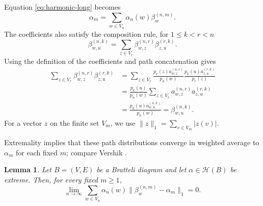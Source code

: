 \documentclass[11pt]{amsart}
\newtheorem{lemma}[theorem]{Lemma}
\theoremstyle{definition}
\theoremstyle{remark}
\begin{document}
Equation \eqref{eq:harmonic-long} becomes
\begin{equation}\label{eq:barycenter}
 \alpha_m=\sum_{w\in V_n}\alpha_n(w)\beta_w^{(n,m)}.
\end{equation}
The coefficients also satisfy the composition rule, for \(1\leq k<r<n\)
\begin{equation}\label{eq:beta-composition}
 \beta_{w,u}^{(n,k)}
 =\sum_{z\in V_r}
 \beta_{w,z}^{(n,r)}\beta_{z,u}^{(r,k)}.
\end{equation}
Using the definition of the coefficients and path concatenation gives
\[
 \begin{aligned}
 \sum_{z\in V_r}\beta_{w,z}^{(n,r)}\beta_{z,u}^{(r,k)}
 &=\sum_{z\in V_r}
   \frac{p_r(z)a_{w,z}^{(n,r)}}{p_n(w)}
   \frac{p_k(u)a_{z,u}^{(r,k)}}{p_r(z)}\\
 &=\frac{p_k(u)}{p_n(w)}
   \sum_{z\in V_r}a_{w,z}^{(n,r)}a_{z,u}^{(r,k)}\\
 &=\frac{p_k(u)a_{w,u}^{(n,k)}}{p_n(w)}
 =\beta_{w,u}^{(n,k)}.
 \end{aligned}
\]
For a vector $z$ on the finite set $V_m$, we use $\|z\|_1=\sum_{v\in
V_m}|z(v)|$.

Extremality implies that these path distributions converge in weighted
average to $\alpha_m$ for each fixed $m$; compare
Vershik \cite[Section~2.5]{Vershik2014}.

\begin{lemma}\label{lem:homogeneous}
Let $B=(V,E)$ be a Bratteli diagram and let $\alpha\in\mathcal H(B)$ be extreme.
Then, for every fixed $m\geq1$,
\begin{equation}\label{eq:homogeneous}
 \lim_{n\to\infty}
 \sum_{w\in V_n}\alpha_n(w)
 \bigl\|\beta_w^{(n,m)}-\alpha_m\bigr\|_1=0.
\end{equation}
\end{lemma}
\end{document}
